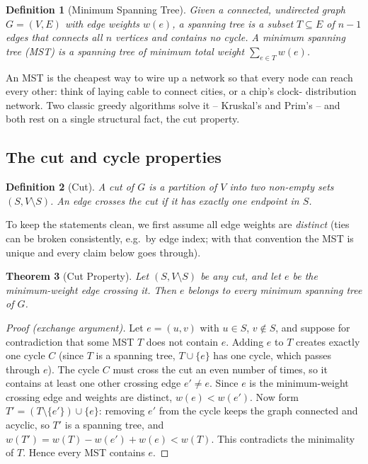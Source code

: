 \documentclass[11pt]{article}
\newtheorem{theorem}{Theorem}[section]
\newtheorem{definition}[theorem]{Definition}
\begin{document}
\begin{definition}[Minimum Spanning Tree]
Given a connected, undirected graph $G = (V,E)$ with edge weights $w(e)$, a
\emph{spanning tree} is a subset $T \subseteq E$ of $n-1$ edges that connects all
$n$ vertices and contains no cycle. A \emph{minimum spanning tree} (MST) is a
spanning tree of minimum total weight $\sum_{e \in T} w(e)$.
\end{definition}

An MST is the cheapest way to wire up a network so that every node can reach
every other: think of laying cable to connect cities, or a chip's clock-
distribution network. Two classic greedy algorithms solve it -- Kruskal's and
Prim's -- and both rest on a single structural fact, the cut property.

\subsection{The cut and cycle properties}

\begin{definition}[Cut]
A \emph{cut} of $G$ is a partition of $V$ into two non-empty sets $(S, V
\setminus S)$. An edge \emph{crosses} the cut if it has exactly one endpoint in
$S$.
\end{definition}

To keep the statements clean, we first assume all edge weights are
\emph{distinct} (ties can be broken consistently, e.g.\ by edge index; with that
convention the MST is unique and every claim below goes through).

\begin{theorem}[Cut Property]
\label{thm:cut}
Let $(S, V\setminus S)$ be any cut, and let $e$ be the \emph{minimum-weight} edge
crossing it. Then $e$ belongs to every minimum spanning tree of $G$.
\end{theorem}

\begin{proof}[Proof (exchange argument)]
Let $e = (u,v)$ with $u \in S$, $v \notin S$, and suppose for contradiction that
some MST $T$ does not contain $e$. Adding $e$ to $T$ creates exactly one cycle
$C$ (since $T$ is a spanning tree, $T \cup \{e\}$ has one cycle, which passes
through $e$). The cycle $C$ must cross the cut an even number of times, so it
contains at least one other crossing edge $e' \ne e$. Since $e$ is the
minimum-weight crossing edge and weights are distinct, $w(e) < w(e')$. Now form
$T' = (T \setminus \{e'\}) \cup \{e\}$: removing $e'$ from the cycle keeps the
graph connected and acyclic, so $T'$ is a spanning tree, and $w(T') = w(T) -
w(e') + w(e) < w(T)$. This contradicts the minimality of $T$. Hence every MST
contains $e$.
\end{proof}
\end{document}
